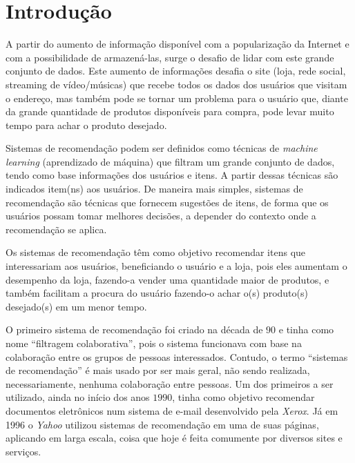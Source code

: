 \documentclass[12pt,a4paper,header]{abnt}
\begin{document}
\tableofcontents{}
\listoffigures
\listoftables

\chapter{Introdução} \label{cap:introducao}

A partir do aumento de informação disponível com a popularização da Internet e com a possibilidade de armazená-las, surge o desafio de lidar com este grande conjunto de dados\cite{isinkaye2015recommendation}. Este aumento de informações desafia o site (loja, rede social, streaming de vídeo/músicas) que recebe todos os dados dos usuários que visitam o endereço, mas também pode se tornar um problema para o usuário que, diante da grande quantidade de produtos disponíveis para compra, pode levar muito tempo para achar o produto desejado\cite{mild2002collaborative}.

Sistemas de recomendação podem ser definidos como técnicas de \textit{machine learning} (aprendizado de máquina) que filtram um grande conjunto de dados, tendo como base informações dos usuários e itens\cite{takahashi2015estudo}. A partir dessas técnicas são indicados item(ns) aos usuários. De maneira mais simples, sistemas de recomendação são técnicas que fornecem sugestões de itens, de forma que os usuários possam tomar melhores decisões\cite{gorakala2015building}, a depender do contexto onde a recomendação se aplica.

Os sistemas de recomendação têm como objetivo recomendar itens que interessariam aos usuários\cite{melville2011recommender}, beneficiando o usuário e a loja, pois eles aumentam o desempenho da loja, fazendo-a vender uma quantidade maior de produtos, e também facilitam a procura do usuário fazendo-o achar o(s) produto(s) desejado(s) em um menor tempo\cite{isinkaye2015recommendation}. 

O primeiro sistema de recomendação foi criado na década de $90$ e tinha como nome ``filtragem colaborativa'', pois o sistema funcionava com base na colaboração entre os grupos de pessoas interessados. Contudo, o termo ``sistemas de recomendação'' é mais usado por ser mais geral, não sendo realizada, necessariamente, nenhuma colaboração entre pessoas\cite{reategui2005sistemas}. Um dos primeiros a ser utilizado, ainda no início dos anos $1990$, tinha como objetivo recomendar documentos eletrônicos num sistema de e-mail desenvolvido pela \textit{Xerox}\cite{goldberg1992using}. Já em 1996 o \textit{Yahoo} utilizou sistemas de recomendação em uma de suas páginas, aplicando em larga escala\cite{reategui2005sistemas}, coisa que hoje é feita comumente por diversos sites e serviços.
\end{document}
